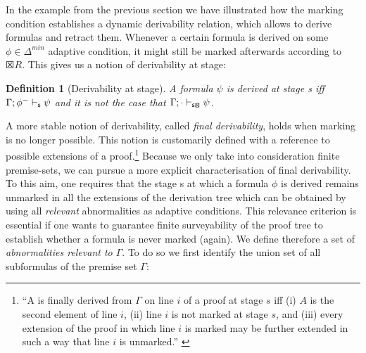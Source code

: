 \documentclass[]{article}
\newtheorem{definition}{Definition}
\newcommand{\Turn}[2]
    { {#1}\vdash_{\textbf{\sf s}}  {#2}}
\newcommand{\TurnMarked}[2]
    { {#1}\vdash_{\textbf{\sf s\XBox}}  {#2}}
\begin{document}
In the example from the previous section we have illustrated how the marking condition establishes a dynamic derivability relation, which allows to derive formulas and retract them. Whenever a certain formula is derived on some $\phi\in \Delta^{min}$ adaptive condition, it might still be marked afterwards according to $\XBox R$.
This gives us a notion of derivability at stage: 

\begin{definition}[Derivability at stage]
A formula $\psi$ is derived at stage {\sf s}  iff $\Turn{\Gamma; \phi^{-}}{\psi}$ and it is not the case that $\TurnMarked{\Gamma; \cdot}{\psi}$.
\end{definition}

A more stable notion of derivability, called \emph{final derivability}, holds when marking is no longer possible. This notion is customarily defined with a reference to possible extensions of a proof.\footnote{``A is finally derived from $\Gamma$ on line $i$ of a proof at stage $s$ iff (i) $A$ is the second element of line $i$, (ii) line $i$ is not marked at stage $s$, and (iii) every extension of the proof in which line $i$ is marked may be further extended in such a way that line $i$ is unmarked.'' \cite[229]{batens07}} Because we only take into consideration finite premise-sets, we can pursue a more explicit characterisation of final derivability.
%
%
To this aim, one requires that the stage {\sf s} at which a formula $\phi$ is derived remains unmarked in all the extensions of the derivation tree which can be obtained by using all \textit{relevant} abnormalities as adaptive conditions. This relevance criterion is essential if one wants to guarantee finite surveyability of the proof tree to establish whether a formula is never marked (again). We define therefore a set of \textit{abnormalities relevant to $\Gamma$}. To do so we first identify the union set of all subformulas of the premise set $\Gamma$:
\end{document}
